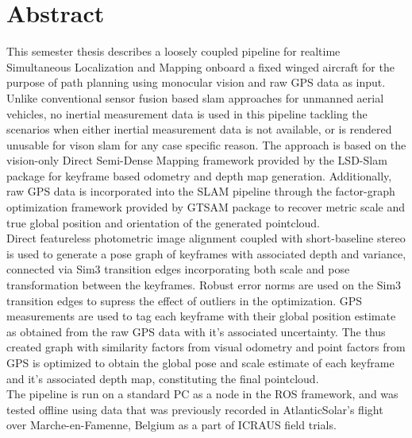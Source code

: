 \chapter*{Abstract}

This semester thesis describes a loosely coupled pipeline for realtime Simultaneous Localization and Mapping onboard a fixed winged aircraft for the purpose of path planning using monocular vision and raw GPS data as input. Unlike conventional sensor fusion based slam approaches for unmanned aerial vehicles, no inertial measurement data is used in this pipeline tackling the scenarios when either inertial measurement data is not available, or is rendered unusable for vison slam for any case specific reason. The approach is based on the vision-only Direct Semi-Dense Mapping framework provided by the LSD-Slam package for keyframe based odometry and depth map generation. Additionally, raw GPS data is incorporated into the SLAM pipeline through the factor-graph optimization framework provided by GTSAM package to recover metric scale and true global position and orientation of the generated pointcloud. \\
Direct featureless photometric image alignment coupled with short-baseline stereo is used to generate a pose graph of keyframes with associated depth and variance, connected via Sim3 transition edges incorporating both scale and pose transformation between the keyframes. Robust error norms are used on the Sim3 transition edges to supress the effect of outliers in the optimization. GPS measurements are used to tag each keyframe with their global position estimate as obtained from the raw GPS data with it's associated uncertainty. The thus created graph with similarity factors from visual odometry and point factors from GPS is optimized to obtain the global pose and scale estimate of each keyframe and it's associated depth map, constituting the final pointcloud.\\
The pipeline is run on a standard PC as a node in the ROS framework, and was tested offline using data that was previously recorded in AtlanticSolar’s flight over Marche-en-Famenne, Belgium as a part of ICRAUS field trials.